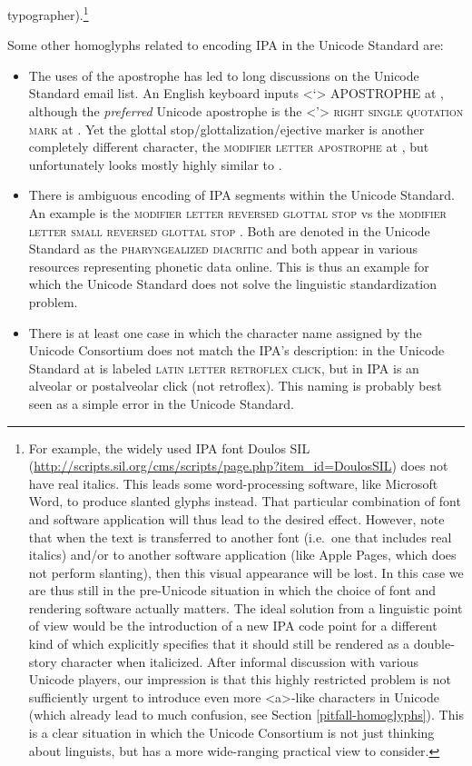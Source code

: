 typographer).\footnote{For example, the widely used IPA font Doulos SIL
(\url{http://scripts.sil.org/cms/scripts/page.php?item\_id=DoulosSIL}) does not
have real italics. This leads some word-processing software, like Microsoft
Word, to produce slanted glyphs instead. That particular combination of font and
software application will thus lead to the desired effect. However, note that
when the text is transferred to another font (i.e.~one that includes real
italics) and/or to another software application (like Apple Pages, which does
not perform slanting), then this visual appearance will be lost. In this case we
are thus still in the pre-Unicode situation in which the choice of font and
rendering software actually matters. The ideal solution from a linguistic point
of view would be the introduction of a new IPA code point for a different kind
of which explicitly specifies that it should still be rendered as a double-story
character when italicized. After informal discussion with various Unicode
players, our impression is that this highly restricted problem is not
sufficiently urgent to introduce even more <a>-like characters in Unicode (which
already lead to much confusion, see Section \ref{pitfall-homoglyphs}). This is a
clear situation in which the Unicode Consortium is not just thinking about
linguists, but has a more wide-ranging practical view to consider.}

Some other homoglyphs related to encoding IPA in the Unicode Standard are:
\begin{itemize}
	\item The uses of the apostrophe has led to long discussions on the Unicode
       Standard email list. An English keyboard inputs
       \textless{}`\textgreater{} APOSTROPHE at , although the
       \textit{preferred} Unicode apostrophe is the \textless{}'\textgreater{}
       \textsc{right single quotation mark} at . Yet the glottal
       stop/glottalization/ejective marker is another completely different
       character, the \textsc{modifier letter apostrophe} at , but
       unfortunately looks mostly highly similar to . 
	\item There is ambiguous encoding of IPA segments within the Unicode Standard.
       An example is the  \textsc{modifier letter reversed glottal
       stop} vs the  \textsc{modifier letter small reversed glottal
       stop} . Both are denoted in the Unicode Standard as the
       \textsc{pharyngealized diacritic} and both appear in various resources
       representing phonetic data online. This is thus an example for which the
       Unicode Standard does not solve the linguistic standardization problem. 
	\item There is at least one case in which the character name assigned by the
       Unicode Consortium does not match the IPA's description: in the Unicode
       Standard at  is labeled \textsc{latin letter retroflex click},
       but in IPA is an alveolar or postalveolar click (not retroflex). This
       naming is probably best seen as a simple error in the Unicode Standard.
\end{itemize}       
  
